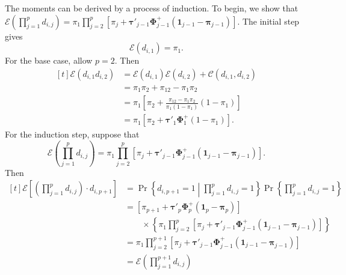 \documentclass[11pt]{article}
\begin{document}
The moments can be derived by a process of induction. To begin, we show that $\mathcal{E}\left(\prod_{j=1}^{p}d_{i,j}\right)=\pi_{1}\prod_{j=2}^{p}\left[\pi_{j}+\boldsymbol{\tau}'_{j-1}\boldsymbol{\Phi}^{+}_{j-1}\left(\boldsymbol{1}_{j-1} - \boldsymbol{\pi}_{j-1}\right)\right]$. The initial step gives
\begin{equation}
\mathcal{E}\left(d_{i,1}\right)=\pi_{1}.
\end{equation}
For the base case, allow $p=2$. Then 
\begin{equation}
\begin{aligned}[t]
\mathcal{E}\left(d_{i,1}d_{i,2}\right)
&=\mathcal{E}\left(d_{i,1}\right)\mathcal{E}\left(d_{i,2}\right)+\mathcal{C}\left(d_{i,1},d_{i,2}\right)\\
&=\pi_{1}\pi_{2} + \pi_{12} - \pi_{1}\pi_{2}\\
&=\pi_{1}\left[\pi_{2}+\frac{\pi_{12}-\pi_{1}\pi_{2}}{\pi_{1}\left(1-\pi_{1}\right)}\left(1-\pi_{1}\right)\right]\\
&=\pi_{1}\left[\pi_{2}+\boldsymbol{\tau}'_{1}\boldsymbol{\Phi}^{+}_{1}\left(1-\pi_{1}\right)\right].
\end{aligned}
\end{equation} 
For the induction step, suppose that
\begin{equation}
\mathcal{E}\left(\prod_{j=1}^{p}d_{i,j}\right)=\pi_{1}\prod_{j=2}^{p}\left[\pi_{j}+\boldsymbol{\tau}'_{j-1}\boldsymbol{\Phi}^{+}_{j-1}\left(\boldsymbol{1}_{j-1}-\boldsymbol{\pi}_{j-1}\right)\right].
\end{equation}
Then
\begin{equation}
\begin{aligned}[t]
\mathcal{E}\left[\left(\prod_{j=1}^{p}d_{i,j}\right)\cdot d_{i,p+1}\right] 
&= \Pr\left\{d_{i,p+1} = 1 \middle| \prod_{j=1}^{p}d_{i,j} = 1\right\}\Pr\left\{\prod_{j=1}^{p} d_{i,j} = 1\right\} \\
&= \left[\pi_{p+1}+\boldsymbol{\tau}'_{p}\boldsymbol{\Phi}^{+}_{p}\left(\boldsymbol{1}_{p}-\boldsymbol{\pi}_{p}\right)\right] \\
&\qquad \times \left\{\pi_{1}\prod_{j=2}^{p}\left[\pi_{j}+\boldsymbol{\tau}'_{j-1}\boldsymbol{\Phi}^{+}_{j-1}\left(\boldsymbol{1}_{j-1}-\boldsymbol{\pi}_{j-1}\right)\right]\right\} \\
& = \pi_{1}\prod_{j=2}^{p+1}\left[\pi_{j}+\boldsymbol{\tau}'_{j-1}\boldsymbol{\Phi}^{+}_{j-1}\left(\boldsymbol{1}_{j-1}-\boldsymbol{\pi}_{j-1}\right)\right] \\
&= \mathcal{E}\left(\prod_{j=1}^{p+1}d_{i,j}\right)
\end{aligned}
\end{equation}
\end{document}
